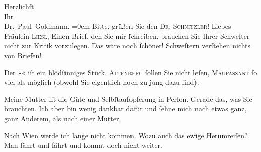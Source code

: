 \pstart
           Herzlichſt {\\[\baselineskip]}Ihr {\\[\baselineskip]}\spacefill\mbox{Dr. Paul Goldmann.}\pend
           \leftskip=0em{}
\pstart
           \noindent{}Bitte, grüßen Sie den \textsc{Dr. Schnitzler}!\pend
           \vspace{1em}{\vspace{1\baselineskip}}
\pstart{}{\pb}Liebes Fräulein \textsc{Liesl},\pend\vspace{0.5em}
\pstart
           Einen Brief, den Sie mir{ }ſchreiben, brauchen Sie Ihrer Schweſter nicht zur Kritik
               vorzulegen. Das wäre noch{ }ſchöner! Schweſtern verſtehen nichts von Briefen!\pend
           
\pstart
           Der »\label{K_L03538-2v}\label{K_L03538-2}« iſt ein
               blödſinniges Stück. \textsc{Altenberg}{ }ſollen Sie nicht leſen, \textsc{Maupassant}{ }ſo viel als möglich (obwohl Sie eigentlich noch zu jung dazu{ }ſind).\pend
           
\pstart
           Meine Mutter iſt die Güte
               und Selbſtaufopferung in Perſon. Gerade das, was Sie brauchten. Ich aber bin wenig
               dankbar dafür und{ }ſehne mich nach etwas ganz, ganz Anderem, als nach einer
               Mutter.\pend
           
\pstart
           Nach Wien werde ich lange nicht kommen. Wozu auch
               das ewige Herumreiſen? {\pb}Man fährt und fährt und
               kommt doch nicht weiter.\pend
           
